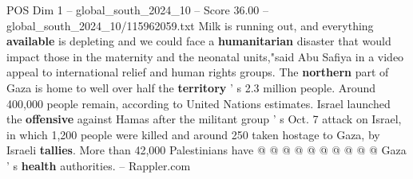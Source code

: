\begin{textsample}{POS Dim 1 – global\_south\_2024\_10 – Score 36.00 – global\_south\_2024\_10/115962059.txt}
Milk is running out, and everything \textbf{available} is depleting and we could face a \textbf{humanitarian} disaster that would impact those in the maternity and the neonatal units,"said Abu Safiya in a video appeal to international relief and human rights groups.
The \textbf{northern} part of Gaza is home to well over half the \textbf{territory} ' s 2.3 million people.
Around 400,000 people remain, according to United Nations estimates.
Israel launched the \textbf{offensive} against Hamas after the militant group ' s Oct. 7 attack on Israel, in which 1,200 people were killed and around 250 taken hostage to Gaza, by Israeli \textbf{tallies}.
More than 42,000 Palestinians have @ @ @ @ @ @ @ @ @ @ Gaza ' s \textbf{health} authorities. -- Rappler.com

\end{textsample}
